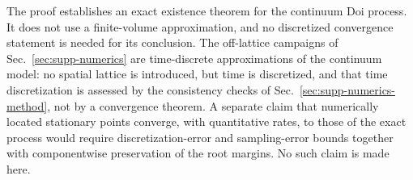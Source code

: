 \documentclass[aps,physrev,onecolumn,amsmath,amssymb,longbibliography]{revtex4-2}
\begin{document}
The proof establishes an exact existence theorem for the continuum Doi
process.  It does not use a finite-volume approximation, and no discretized
convergence statement is needed for its conclusion.  The off-lattice
campaigns of Sec.~\ref{sec:supp-numerics} are time-discrete approximations of
the continuum model: no spatial lattice is introduced, but time is
discretized, and that time discretization is assessed by the
consistency checks of Sec.~\ref{sec:supp-numerics-method}, not by a
convergence theorem.  A separate claim that numerically located stationary
points converge, with quantitative rates, to those of the exact process
would require discretization-error and sampling-error bounds together with
componentwise preservation of the root margins.  No such claim is made
here.


\end{document}
